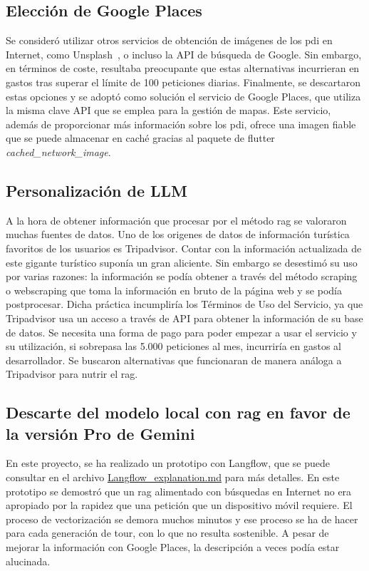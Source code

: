 \subsection{Elección de Google Places}
Se consideró utilizar otros servicios de obtención de imágenes de los \acrshort{pdi} en Internet, como Unsplash~\cite{unsplash}, o incluso la API de búsqueda de Google. Sin embargo, en términos de coste, resultaba preocupante que estas alternativas incurrieran en gastos tras superar el límite de 100 peticiones diarias. Finalmente, se descartaron estas opciones y se adoptó como solución el servicio de Google Places, que utiliza la misma clave API que se emplea para la gestión de mapas. Este servicio, además de proporcionar más información sobre los \acrlong{pdi}, ofrece una imagen fiable que se puede almacenar en caché gracias al paquete de flutter \textit{cached\_network\_image}.

\subsection{Personalización de LLM}
A la hora de obtener información que procesar por el método \acrshort{rag} se valoraron muchas fuentes de datos. Uno de los origenes de datos de información turística favoritos de los usuarios es Tripadvisor. Contar con la información actualizada de este gigante turístico suponía un gran aliciente. Sin embargo se desestimó su uso por varias razones: la información se podía obtener a través del método scraping o webscraping que toma la información en bruto de la página web y se podía postprocesar. Dicha práctica incumpliría los Términos de Uso del Servicio, ya que Tripadvisor usa un acceso a través de API para obtener la información de su base de datos. Se necesita una forma de pago para poder empezar a usar el servicio y su utilización, si sobrepasa las 5.000 peticiones al mes, incurriría en gastos al desarrollador. Se buscaron alternativas que funcionaran de manera análoga a Tripadvisor para nutrir el \acrshort{rag}.

\subsection{Descarte del modelo local con \acrshort{rag} en favor de la versión Pro de Gemini}

En este proyecto, se ha realizado un prototipo con Langflow, que se puede consultar en el archivo \href{https://github.com/fps1001/TFGII_FPisot/blob/main/project-prototypes/Langflow_explanation.md}{Langflow\_explanation.md} para más detalles. En este prototipo se 
demostró que un \acrshort{rag} alimentado con búsquedas en Internet no era apropiado por la rapidez que una petición que un dispositivo móvil requiere. El proceso de vectorización se demora muchos minutos y ese proceso se ha de hacer para cada generación de tour, con lo que no resulta sostenible. A pesar de mejorar la información con Google Places, la descripción a veces podía estar alucinada. 

